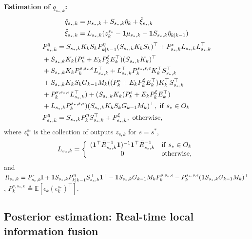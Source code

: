 \documentclass[letterpaper, 10 pt, conference]{ieeeconf}
\begin{document}
\textbf{Estimation of $q_{s_*,k}$:} 
\begin{align*}
    &\hat{q}_{s_*,k} = \mu_{s_*,k} + S_{s_*,k} \hat{\eta}_k + \hat{\xi}_{s_*,k}\nonumber\\
    &\hat{\xi}_{s_*,k} = 
         L_{s_*,k} (z_{k}^{s_*} - \bold{1}\mu_{s_*,k} - \bold{1}S_{s_*,k}\hat{\eta}_{k|k-1})
         \end{align*}\begin{align}
&P_{s_*,k}^q=S_{s_*,k}K_kS_k P_{k|k-1}^\eta(S_{s_*,k}K_kS_k)^\top+P_{s_*,k}^\epsilon L_{s_*,k}L_{s_*,k}^\top\nonumber\\
&+S_{s_*,k}K_k(P_k^\epsilon+E_kP_k^\xi E_k^\top) (S_{s_*,k}K_k)^\top\nonumber\\
&+S_{s_*,k}K_kP_k^{s,s_*,\epsilon}L_{s_*,k}^\top
+L_{s_*,k}^\top P_k^{s_*,s,\epsilon}K_k^\top S_{s_*,k}^\top\nonumber\\
&+S_{s_*,k}K_kS_k G_{k-1}M_k((P_k^\epsilon + E_k P_k^\xi E_k^\top) K_k^\top S_{s_*,k}^\top\nonumber\\
&+ P_k^{s,s_*,\epsilon}L_{s_*,k}^\top)+(S_{s_*,k} K_k (P_k^\epsilon + E_k P_k^\xi E_k^\top) \nonumber\\
& + L_{s_*,k}P_k^{s_*,s,\epsilon})(S_{s_*,k}K_kS_k G_{k-1}M_k)^\top, {\rm \ if \ } s_* \in O_k\nonumber\\
&P_{s_*,k}^q = S_{s_*,k}P_{k}^\eta S_{s_*,k}^\top+P_{s_*,k}^\xi, {\rm \ otherwise},
\label{eq:yhat}
\end{align}
where $z_k^{s_*}$ is the collection of outputs $z_{s,k}$ for $s =s^*$,
\begin{align}
    L_{s_*,k} =
    \left\{
    \begin{array}{cc}
             (\bold{1}^\top \bar{R}_{s_*,k}^{-1} \bold{1})^{-1}\bold{1}^\top \bar{R}_{s_*,k}^{-1}&{\rm if } \ s_* \in O_k \\
         0& {\rm otherwise} ,
    \end{array}
    \right.
    \label{eq:G}
\end{align}
and
$\bar{R}_{s_*,k}=P_{s_*,k}^{\epsilon}\mathbb{I} + \bold{1}
S_{s_*,k} P_{k|k-1}^\eta S_{s_*,k}^\top \bold{1}^\top-\bold{1}
S_{s_*,k}G_{k-1}M_kP_k^{s,s_*,\epsilon}
-P_k^{s_*,s,\epsilon}(\bold{1}S_{s_*,k}G_{k-1}M_k)^\top$, $P_k^{s,s_*,\epsilon}\triangleq {\mathbb E}[\epsilon_k(\epsilon_k^{s_*})^\top]$.

\subsection{Posterior estimation: Real-time local information fusion}\label{sec:posterior}
\end{document}
